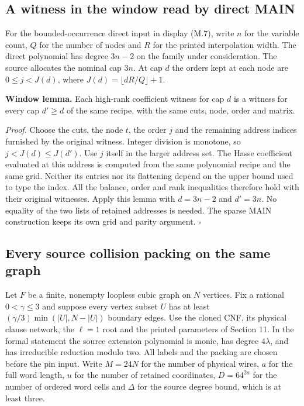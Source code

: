 \documentclass[
  11pt,
]{article}
\begin{document}
\subsection{A witness in the window read by direct MAIN}
For the bounded-occurrence direct input in display (M.7), write \(n\) for
the variable count, \(Q\) for the number of nodes and \(R\) for the
printed interpolation width. The direct polynomial has degree \(3n-2\)
on the family under consideration. The source allocates the nominal cap
\(3n\). At cap \(d\) the orders kept at each node are \(0\le j<J(d)\),
where \(J(d)=\lfloor dR/Q\rfloor+1\).

\textbf{Window lemma.} Each high-rank coefficient witness for cap \(d\)
is a witness for every cap \(d'\ge d\) of the same recipe, with the same
cuts, node, order and matrix.

\emph{Proof.} Choose the cuts, the node \(t\), the order \(j\) and the
remaining address indices furnished by the original witness. Integer
division is monotone, so \(j<J(d)\le J(d')\). Use \(j\) itself in the
larger address set. The Hasse coefficient evaluated at this address is
computed from the same polynomial recipe and the same grid. Neither
its entries nor its flattening depend on the upper bound used to type
the index. All the balance, order and rank inequalities therefore hold
with their original witnesses. Apply this lemma with \(d=3n-2\) and
\(d'=3n\). No equality of the two lists of retained addresses is needed.
The sparse MAIN construction keeps its own grid and parity argument.
\(\square\)

\subsection{Every source collision packing on the same graph}
Let \(F\) be a finite, nonempty loopless cubic graph on \(N\) vertices.
Fix a rational \(0<\gamma\le3\) and suppose every vertex subset \(U\)
has at least \((\gamma/3)\min(|U|,N-|U|)\) boundary edges. Use the
cloned CNF, its physical clause network, the \(\ell=1\) root and the
printed parameters of Section 11. In the formal statement the source
extension polynomial is monic, has degree \(4\lambda\), and has
irreducible reduction modulo two. All labels and the packing are chosen
before the pin input. Write \(M=24N\) for the number of physical wires,
\(a\) for the full word length, \(u\) for the number of retained
coordinates, \(D=64^{2a}\) for the number of ordered word cells and
\(\Delta\) for the source degree bound, which is at least three.
\end{document}
